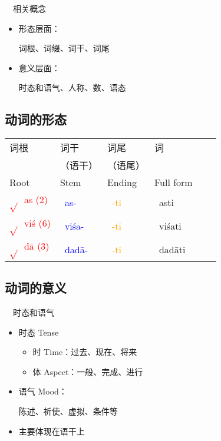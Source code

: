\documentclass[17pt]{beamer}
\newcommand{\skt}[1]{{\sanskritfont{#1}}} %
\newcommand{\verbroot}[1]{\textcolor{red}{$\sqrt{}$#1}}
\newcommand{\sktroot}[1]{{\verbroot{\skt{#1}}}}
\newcommand{\skttransroot}[1]{{\sktroot{#1}~\textcolor{red}{#1}}}
\newcommand{\verbstem}[1]{\textcolor{blue}{#1\nobreakdash-}}
\newcommand{\sktverbstem}[1]{{\textcolor{blue}{\skt{#1\nobreakdash-}}}}
\newcommand{\skttransverbstem}[1]{{\sktverbstem{#1}~\verbstem{#1}}}
\newcommand{\wordending}[1]{\textcolor{Orange}{\nobreakdash-#1}}
\newcommand{\sktending}[1]{{\textcolor{Orange}{\skt{-#1}}}}
\newcommand{\skttransending}[1]{{\sktending{#1}~\wordending{#1}}}
\newcommand{\fullpada}[1]{\textcolor{OliveGreen}{#1}}
\newcommand{\sktpada}[1]{{\textcolor{OliveGreen}{\skt{#1}}}}
\newcommand{\skttranspada}[1]{{\sktpada{#1}~\fullpada{#1}}}
\newcommand{\veryimportant}[1]{\textcolor{red}{#1}}
\begin{document}
\begin{frame}{\insertsection ~~相关概念}
  \begin{itemize}
    \item
      形态层面：
      
      词根、词缀、词干、词尾
    \item
      意义层面：
      
      时态和语气、人称、数、语态
  \end{itemize}
  
\end{frame}

\subsection{动词的形态}

\begin{frame}{\insertsubsection }
  \small
  \centering
  \begin{tabular}{@{}llllll@{}} %
    词根 & 词干 & 词尾 & 词  \\
    & （语干） & （语尾） &   \\
    Root & Stem & Ending & Full form   \\    
    \skttransroot{as} \veryimportant{(2)} & \skttransverbstem{as} & \skttransending{ti} & \skttranspada{asti}  \\
    \skttransroot{viś} \veryimportant{(6)} & \skttransverbstem{viśa} & \skttransending{ti} & \skttranspada{viśati}  \\
    \skttransroot{dā} \veryimportant{(3)} & \skttransverbstem{dadā} & \skttransending{ti} & \skttranspada{dadāti} \\
  \end{tabular}
\end{frame}

\subsection{动词的意义}

\begin{frame}{\insertsubsection ~~时态和语气}
  \begin{itemize}
    \item
      时态 Tense
      \begin{itemize}
        \item 时 Time：过去、现在、将来
        \item 体 Aspect：一般、完成、进行
      \end{itemize}
    \item
      语气 Mood：
      
    陈述、祈使、虚拟、条件等
    \item
      主要体现在语干上
  \end{itemize}
\end{frame}
\end{document}
